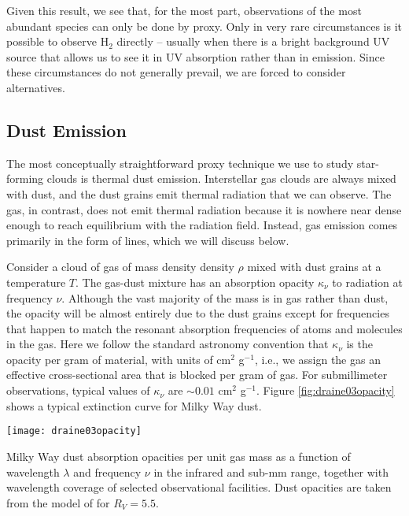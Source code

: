 Given this result, we see that, for the most part, observations of the most abundant species can only be done by proxy. Only in very rare circumstances is it possible to observe H$_2$ directly -- usually when there is a bright background UV source that allows us to see it in UV absorption rather than in emission. Since these circumstances do not generally prevail, we are forced to consider alternatives.

\subsection{Dust Emission}

The most conceptually straightforward proxy technique we use to study star-forming clouds is thermal dust emission. Interstellar gas clouds are always mixed with dust, and the dust grains emit thermal radiation that we can observe. The gas, in contrast, does not emit thermal radiation because it is nowhere near dense enough to reach equilibrium with the radiation field. Instead, gas emission comes primarily in the form of lines, which we will discuss below.
  
Consider a cloud of gas of mass density density $\rho$ mixed with dust grains at a temperature $T$. The gas-dust mixture has an absorption opacity $\kappa_{\nu}$ to radiation at frequency $\nu$. Although the vast majority of the mass is in gas rather than dust, the opacity will be almost entirely due to the dust grains except for frequencies that happen to match the resonant absorption frequencies of atoms and molecules in the gas. Here we follow the standard astronomy convention that $\kappa_{\nu}$ is the opacity per gram of material, with units of cm$^2$ g$^{-1}$, i.e., we assign the gas an effective cross-sectional area that is blocked per gram of gas. For submillimeter observations, typical values of $\kappa_{\nu}$ are $\sim 0.01$ cm$^{2}$ g$^{-1}$. Figure \ref{fig:draine03opacity} shows a typical extinction curve for Milky Way dust.

\begin{marginfigure}
\texttt{[image: draine03opacity]}
\caption[Dust absorption opacity]{
\label{fig:draine03opacity}
Milky Way dust absorption opacities per unit gas mass as a function of wavelength $\lambda$ and frequency $\nu$ in the infrared and sub-mm range, together with wavelength coverage of selected observational facilities. Dust opacities are taken from the model of \citet{draine03a} for $R_V = 5.5$.
}
\end{marginfigure}

